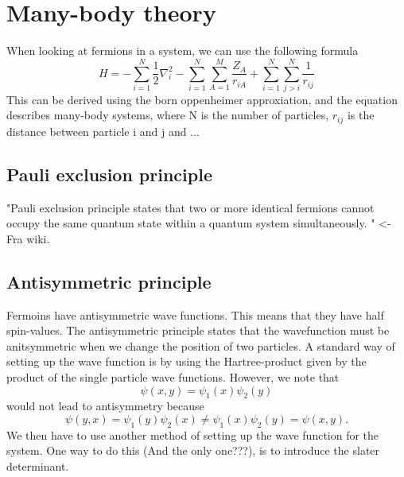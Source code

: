 \section{Many-body theory}
When looking at fermions in a system, we can use the following formula
\begin{equation}
    H = -\sum_{i=1}^N \frac{1}{2}\nabla_i^2 - \sum_{i=1}^N \sum_{A=1}^M \frac{Z_A}{r_{iA}} + \sum_{i=1}^N \sum_{j>i}^N\frac{1}{r_{ij}}
\end{equation}
This can be derived using the born oppenheimer approxiation, and the equation describes many-body systems, where N is the number of particles, $r_{ij}$ is the distance between particle i and j and ...

\subsection{Pauli exclusion principle}
"Pauli exclusion principle states that two or more identical fermions cannot occupy the same quantum state within a quantum system simultaneously. " <- Fra wiki. 

\subsection{Antisymmetric principle}
Fermoins have antisymmetric wave functions. This means that they have half spin-values. 
The antisymmetric principle states that the wavefunction must be anitsymmetric when we change the position of two particles. A standard way of setting up the wave function is by using the Hartree-product given by the product of the single particle wave functions. However, we note that
\begin{equation}
    \psi(x,y) = \psi_1(x)\psi_2(y)
\end{equation}
would not lead to antisymmetry because 
\begin{equation}
    \psi(y,x) = \psi_1(y)\psi_2(x) \neq \psi_1(x)\psi_2(y) = \psi(x,y).
\end{equation}
We then have to use another method of setting up the wave function for the system. One way to do this (And the only one???), is to introduce the slater determinant. 
